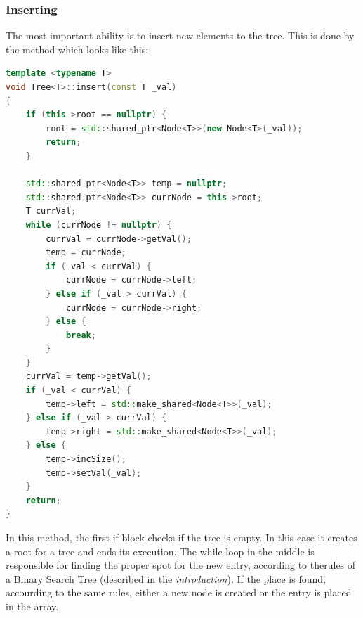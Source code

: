 \documentclass[12pt]{article}
\begin{document}
\subsubsection{Inserting}
The most important ability is to insert new elements to the tree. This is done by the method which looks like this:
\begin{footnotesize}
\begin{lstlisting}[language=C++]
template <typename T>
void Tree<T>::insert(const T _val)
{
    if (this->root == nullptr) {
        root = std::shared_ptr<Node<T>>(new Node<T>(_val));
        return;
    }

    std::shared_ptr<Node<T>> temp = nullptr;
    std::shared_ptr<Node<T>> currNode = this->root;
    T currVal;
    while (currNode != nullptr) {
        currVal = currNode->getVal();
        temp = currNode;
        if (_val < currVal) {
            currNode = currNode->left;
        } else if (_val > currVal) {
            currNode = currNode->right;
        } else {
            break;
        }
    }
    currVal = temp->getVal();
    if (_val < currVal) {
        temp->left = std::make_shared<Node<T>>(_val);
    } else if (_val > currVal) {
        temp->right = std::make_shared<Node<T>>(_val);
    } else {
        temp->incSize();
        temp->setVal(_val);
    }
    return;
}
\end{lstlisting}
\end{footnotesize}

In this method, the first if-block checks if the tree is empty. In this case it creates a root for a tree and ends its execution. The while-loop in the middle is responsible for finding the proper spot for the new entry, according to therules of a Binary Search Tree (described in the \textit{introduction}). If the place is found, accourding to the same rules, either a new node is created or the entry is placed in the array.

\pagebreak
\end{document}
